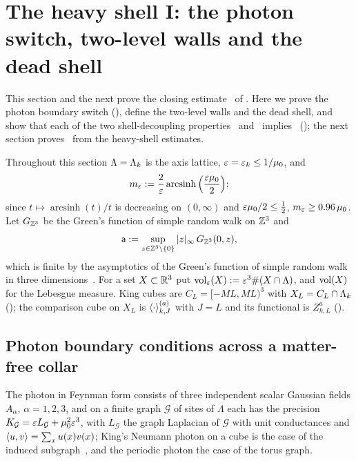 \section{The heavy shell I: the photon switch, two-level walls and the dead shell}

This section and the next prove the closing estimate \TIz\ of . Here we prove the photon boundary switch (), define the two-level walls and the dead shell, and show that each of the two shell-decoupling properties \SHz\ and \REz\ implies \TIz\ (); the next section proves \REz\ from the heavy-shell estimates.

Throughout this section $\Lambda=\Lambda_k$ is the axis lattice, $\varepsilon=\varepsilon_k\le1/\mu_0$, and
\[
m_{\varepsilon}:=\frac2{\varepsilon}\operatorname{arcsinh}\Big(\frac{\varepsilon\mu_0}2\Big);
\]
since $t\mapsto\operatorname{arcsinh}(t)/t$ is decreasing on $(0,\infty)$ and $\varepsilon\mu_0/2\le\frac12$, $m_{\varepsilon}\ge0.96\,\mu_0$. Let $G_{\mathbb Z^3}$ be the Green's function of simple random walk on $\mathbb Z^3$ and
\[
\mathsf a:=\sup_{z\in\mathbb Z^3\setminus\{0\}}|z|_\infty\,G_{\mathbb Z^3}(0,z),
\]
which is finite by the asymptotics of the Green's function of simple random walk in three dimensions~\cite[Chap.~4]{LL10}. For a set $X\subset\mathbb R^3$ put $\operatorname{vol}_{\varepsilon}(X):=\varepsilon^3\#(X\cap\Lambda)$, and $\operatorname{vol}(X)$ for the Lebesgue measure. King cubes are $C_L=[-ML,ML)^3$ with $X_L=C_L\cap\Lambda_k$ (); the comparison cube on $X_L$ is $\langle \cdot\rangle^{(a)}_{k,J}$ with $J=L$ and its functional is $Z^a_{k,L}$ ().

\subsection{Photon boundary conditions across a matter-free collar}

The photon in Feynman form consists of three independent scalar Gaussian fields $A_\alpha$, $\alpha=1,2,3$, and on a finite graph $\mathcal G$ of sites of $\Lambda$ each has the precision $K_{\mathcal G}=\varepsilon L_{\mathcal G}+\mu_0^2\varepsilon^3$, with $L_{\mathcal G}$ the graph Laplacian of $\mathcal G$ with unit conductances and $\langle u,v\rangle=\sum_xu(x)v(x)$; King's Neumann photon on a cube is the case of the induced subgraph~\cite[(2.5), p.~333]{K2}, and the periodic photon the case of the torus graph.

